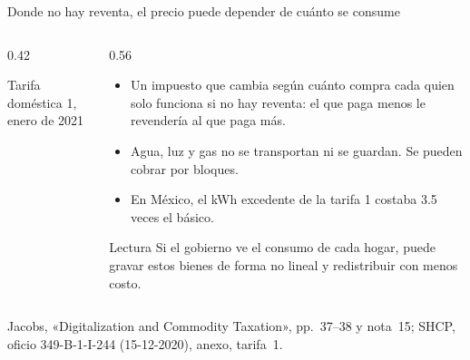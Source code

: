 \documentclass[aspectratio=169,11pt]{beamer}
\newcommand{\fuente}[1]{\par\vfill{\small\color{cGris}#1\par}}
\begin{document}
\begin{frame}{Donde no hay reventa, el precio puede depender de cuánto se consume}
  \begin{columns}[T]
    \begin{column}{0.42\textwidth}
      \centering
      \par{\small Tarifa doméstica 1, enero de 2021}
    \end{column}
    \begin{column}{0.56\textwidth}
      \begin{itemize}
        \item Un impuesto que cambia según cuánto compra cada quien solo funciona si no hay reventa: el que paga menos le revendería al que paga más.
        \item Agua, luz y gas no se transportan ni se guardan. Se pueden cobrar por bloques.
        \pause
        \item En México, el kWh excedente de la tarifa 1 costaba 3.5 veces el básico.
      \end{itemize}
      \pause
      \begin{block}{Lectura}
        Si el gobierno ve el consumo de cada hogar, puede gravar estos bienes de forma no lineal y redistribuir con menos costo.
      \end{block}
    \end{column}
  \end{columns}
  \fuente{Jacobs, «Digitalization and Commodity Taxation», pp.~37--38 y nota~15; SHCP, oficio 349-B-1-I-244 (15-12-2020), anexo, tarifa~1.}
\end{frame}
\end{document}
